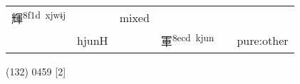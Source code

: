 \documentclass[14pt,a4paper]{scrartcl}
\begin{document}
\begin{longtable}[c]{@{}llllll@{}}
\begin{minipage}[t]{0.14\columnwidth}
輝\textsuperscript{8f1d~xjwɨj}
\strut\end{minipage} &
\begin{minipage}[t]{0.14\columnwidth}\raggedright\strut
\strut\end{minipage} &
\begin{minipage}[t]{0.14\columnwidth}\raggedright\strut
mixed
\strut\end{minipage}\tabularnewline
\begin{minipage}[t]{0.14\columnwidth}\raggedright\strut
𠣞
\strut\end{minipage} &
\begin{minipage}[t]{0.14\columnwidth}\raggedright\strut
hjunH
\strut\end{minipage} &
\begin{minipage}[t]{0.14\columnwidth}\raggedright\strut
\strut\end{minipage} &
\begin{minipage}[t]{0.14\columnwidth}\raggedright\strut
軍\textsuperscript{8ecd~kjun}
\strut\end{minipage} &
\begin{minipage}[t]{0.14\columnwidth}\raggedright\strut
\strut\end{minipage} &
\begin{minipage}[t]{0.14\columnwidth}\raggedright\strut
pure:other
\strut\end{minipage}\tabularnewline
\bottomrule
\end{longtable}

(132) 0459 {[}2{]}
\end{document}
